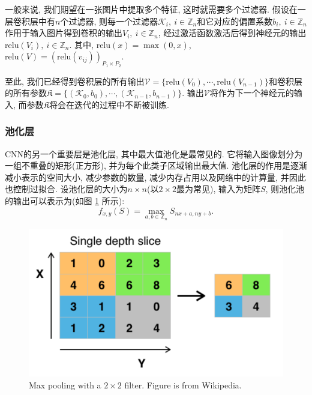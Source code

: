 \documentclass[12pt]{ctexart}
\begin{document}
一般来说, 我们期望在一张图片中提取多个特征, 这时就需要多个过滤器. 假设在一层卷积层中有$n$个过滤器, 则每一个过滤器$\mathcal{K}_{i},\ i\in \mathbb{Z}_{n}$和它对应的偏置系数$b_{i},\ i\in \mathbb{Z}_{n}$作用于输入图片得到卷积的输出$V_{i},\ i\in \mathbb{Z}_{n}$, 经过激活函数激活后得到神经元的输出$\mathrm{relu}(V_{i}),\ i\in \mathbb{Z}_{n}$. 其中, $\mathrm{relu}(x)=\max(0,x)$, $\mathrm{relu}(V)=(\mathrm{relu}(v_{ij}))_{P_{1}\times P_{2}}$.

 至此, 我们已经得到卷积层的所有输出$\mathcal{V}=\{\mathrm{relu}(V_{0}), \cdots, \mathrm{relu}(V_{n-1})\}$和卷积层的所有参数$\mathfrak{K}=\{(\mathcal{K}_{0},b_{0}), \cdots, (\mathcal{K}_{n-1},b_{n-1})\}$.
输出$\mathcal{V}$将作为下一个神经元的输入, 而参数$\mathfrak{K}$将会在迭代的过程中不断被训练.

\subsubsection{池化层}
CNN的另一个重要层是池化层, 其中最大值池化是最常见的. 它将输入图像划分为一组不重叠的矩形(正方形), 并为每个此类子区域输出最大值. 池化层的作用是逐渐减小表示的空间大小, 减少参数的数量, 减少内存占用以及网络中的计算量, 并因此也控制过拟合. 
设池化层的大小为$n\times n$(以$2\times 2$最为常见), 输入为矩阵$S$, 则池化池的输出可以表示为(如图 \ref{fig2} 所示):
$$f_{x,y}(S)=\max_{a,b\in \mathbb{Z}_{n}} S_{nx+a,ny+b}.$$ 
\begin{figure}[H]
  \centering
\includegraphics[scale=.5]{5.png} 
\caption{Max pooling with a $2\times 2$ filter. Figure is from Wikipedia.}
\label{fig2}
\end{figure}
\end{document}
